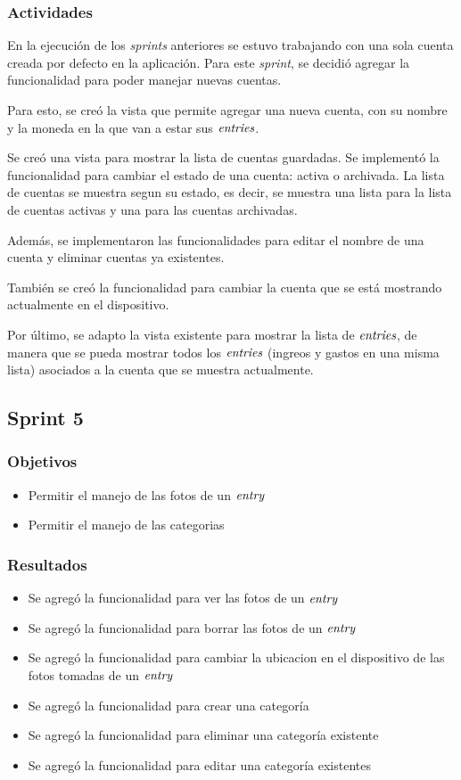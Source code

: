 \subsubsection{Actividades}
En la ejecución de los \textit{sprints} anteriores se estuvo trabajando con una sola cuenta creada por defecto en la aplicación. Para este \textit{sprint}, se decidió agregar la funcionalidad para poder manejar nuevas cuentas. 

Para esto, se creó la vista que permite agregar una nueva cuenta, con su nombre y la moneda en la que van a estar sus $\textit{entries}$.

Se creó una vista para mostrar la lista de cuentas guardadas. Se implementó la funcionalidad para cambiar el estado de una cuenta: activa o archivada. La lista de cuentas se muestra segun su estado, es decir, se muestra una lista para la lista de cuentas activas y una para las cuentas archivadas. 

Además, se implementaron las funcionalidades para editar el nombre de una cuenta y eliminar cuentas ya existentes.

También se creó la funcionalidad para cambiar la cuenta que se está mostrando actualmente en el dispositivo.

Por último, se adapto la vista existente para mostrar la lista de $\textit{entries}$, de manera que se pueda mostrar todos los $\textit{entries}$ (ingreos y gastos en una misma lista) asociados a la cuenta que se muestra actualmente.




\subsection{Sprint 5}
\subsubsection{Objetivos}
\begin{itemize}
\item Permitir el manejo de las fotos de un $\textit{entry}$
\item Permitir el manejo de las categorias
\end{itemize}

\subsubsection{Resultados}
\begin{itemize}
\item Se agregó la funcionalidad para ver las fotos de un $\textit{entry}$
\item Se agregó la funcionalidad para borrar las fotos de un $\textit{entry}$
\item Se agregó la funcionalidad para cambiar la ubicacion en el dispositivo de las fotos tomadas de un $\textit{entry}$
\item Se agregó la funcionalidad para crear una categoría
\item Se agregó la funcionalidad para eliminar una categoría existente
\item Se agregó la funcionalidad para editar una categoría existentes
\end{itemize}

